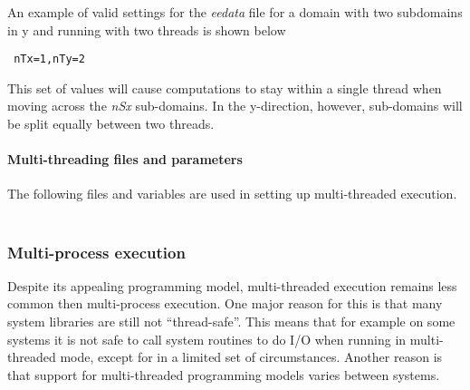 An example of valid settings for the {\em eedata} file for a
domain with two subdomains in y and running with two threads is shown 
below
\begin{verbatim}
 nTx=1,nTy=2
\end{verbatim}
This set of values will cause computations to stay within a single
thread when moving across the {\em nSx} sub-domains. In the y-direction,
however, sub-domains will be split equally between two threads.

\paragraph{Multi-threading files and parameters} The following
files and variables are used in setting up multi-threaded execution.\\

 \\

\subsubsection{Multi-process execution}
\label{sec:multi-process-execution}

Despite its appealing programming model, multi-threaded execution remains
less common then multi-process execution. One major reason for this
is that many system libraries are still not ``thread-safe''. This means that for
example on some systems it is not safe to call system routines to
do I/O when running in multi-threaded mode, except for in a limited set of 
circumstances. Another reason is that support for multi-threaded programming
models varies between systems. 

